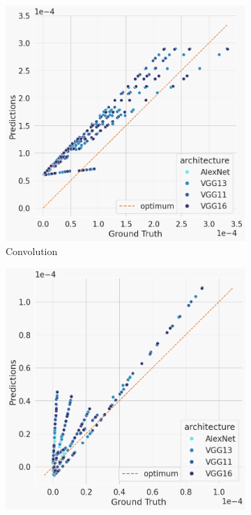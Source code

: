 \begin{figure}[h]
        \centering
        \begin{subfigure}[b]{0.47\textwidth}
            \centering
            \includegraphics[width=\textwidth]{resources/full-predictions-convolution.png}
            \caption[]%
            {{\small Convolution}}    
            \label{}
        \end{subfigure}
        \hfill
        \begin{subfigure}[b]{0.47\textwidth}  
            \centering 
            \includegraphics[width=\textwidth]{resources/full-predictions-maxpooling.png}

\end{subfigure}
\end{figure}
